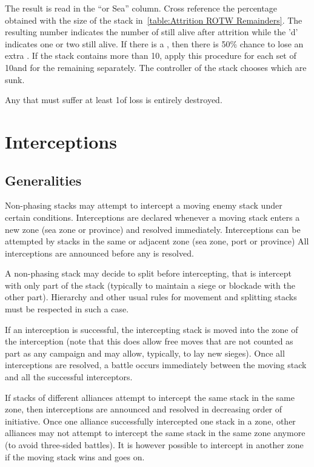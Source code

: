 The result is read in the ``\ROTW or Sea'' column. Cross reference the
percentage obtained with the size of the stack in~\ref{table:Attrition ROTW
  Remainders}. The resulting number indicates the number of \ND still alive
after attrition while the 'd' indicates one or two \NDE still alive. If there
is a \textetoile, then there is 50\% chance to lose an extra \NDE. If the
stack contains more than 10\ND, apply this procedure for each set of 10\ND and
for the remaining \ND separately. The controller of the stack chooses which
\ND are sunk.

Any \NTD that must suffer at least 1\NDE of loss is entirely destroyed.

\section{Interceptions}
\label{chMilitary:interceptions}
\subsection{Generalities}
Non-phasing stacks may attempt to intercept a moving enemy stack under certain
conditions. Interceptions are declared whenever a moving stack enters a new
zone (sea zone or province) and resolved immediately. Interceptions can be
attempted by stacks in the same or adjacent zone (sea zone, port or province)
All interceptions are announced before any is resolved.

A non-phasing stack may decide to split before intercepting, that is intercept
with only part of the stack (typically to maintain a siege or blockade with
the other part). Hierarchy and other usual rules for movement and splitting
stacks must be respected in such a case.

If an interception is successful, the intercepting stack is moved into the
zone of the interception (note that this does allow free moves that are not
counted as part as any campaign and may allow, typically, to lay new
sieges). Once all interceptions are resolved, a battle occurs immediately
between the moving stack and all the successful interceptors.

If stacks of different alliances attempt to intercept the same stack in the
same zone, then interceptions are announced and resolved in decreasing order
of initiative. Once one alliance successfully intercepted one stack in a zone,
other alliances may not attempt to intercept the same stack in the same zone
anymore (to avoid three-sided battles). It is however possible to intercept in
another zone if the moving stack wins and goes on.

